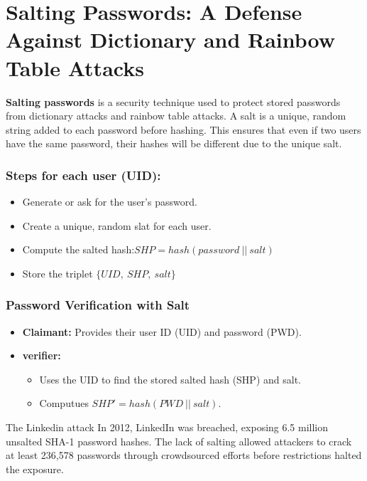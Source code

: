 \section{Salting Passwords: A Defense Against Dictionary and Rainbow Table Attacks}
\textbf{Salting passwords} is a security technique used to protect stored passwords from dictionary attacks and rainbow table attacks. A salt is a unique, random string added to each password before hashing. This ensures that even if two users have the same password, their hashes will be different due to the unique salt.
\newline
\newline
\begin{minipage}[t]{0.5\textwidth}
    \subsubsection{Steps for each user (UID):}
    \begin{itemize}
        \item Generate or ask for the user's password.
        \item Create a unique, random slat for each user.
        \item Compute the salted hash:\(SHP=hash(password\ ||\ salt)\)
        \item Store the triplet \(\{UID,\ SHP,\ salt\}\)
    \end{itemize}
\end{minipage} 
\hspace{0.5cm}
\begin{minipage}[t]{0.5\textwidth}
    \subsubsection{Password Verification with Salt}
   \begin{itemize}
    \item \textbf{Claimant:} Provides their user ID (UID) and password (PWD).
    \item \textbf{verifier:} 
    \begin{itemize}
        \item Uses the UID to find the stored salted hash (SHP) and salt. 
        \item Computues \(SHP'=hash(PWD\ || \ salt)\).
    \end{itemize}
   \end{itemize}
\end{minipage}
\begin{quotebox}[colframe=blue!10!white, colback=blue!5!white]{The Linkedin attack}
In 2012, LinkedIn was breached, exposing 6.5 million unsalted SHA-1 password hashes. The lack of salting allowed attackers to crack at least 236,578 passwords through crowdsourced efforts before restrictions halted the exposure.
\end{quotebox}

